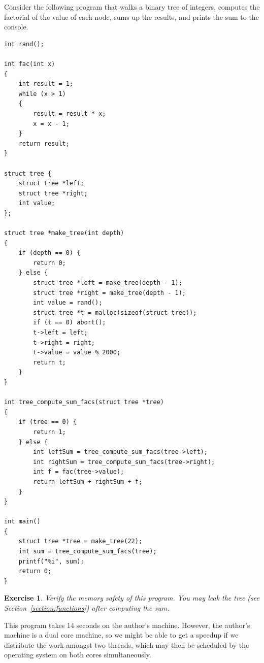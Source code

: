\documentclass{article}
\newtheorem{exercise}{Exercise}
\begin{document}
Consider the following program that walks a binary tree of
integers, computes the factorial of the value of each node, sums
up the results, and prints the sum to the console.
\begin{lstlisting}
int rand();

int fac(int x)
{
    int result = 1;
    while (x > 1)
    {
        result = result * x;
        x = x - 1;
    }
    return result;
}

struct tree {
    struct tree *left;
    struct tree *right;
    int value;
};

struct tree *make_tree(int depth)
{
    if (depth == 0) {
        return 0;
    } else {
        struct tree *left = make_tree(depth - 1);
        struct tree *right = make_tree(depth - 1);
        int value = rand();
        struct tree *t = malloc(sizeof(struct tree));
        if (t == 0) abort();
        t->left = left;
        t->right = right;
        t->value = value % 2000;
        return t;
    }
}

int tree_compute_sum_facs(struct tree *tree)
{
    if (tree == 0) {
        return 1;
    } else {
        int leftSum = tree_compute_sum_facs(tree->left);
        int rightSum = tree_compute_sum_facs(tree->right);
        int f = fac(tree->value);
        return leftSum + rightSum + f;
    }
}

int main()
{
    struct tree *tree = make_tree(22);
    int sum = tree_compute_sum_facs(tree);
    printf("%i", sum);
    return 0;
}
\end{lstlisting}

\begin{exercise}\label{exercise:threads0}
Verify the memory safety of this program. You may leak the tree (see Section~\ref{section:functions}) after computing the sum.
\end{exercise}

This program takes 14 seconds on the author's machine. However,
the author's machine is a dual core machine, so we might be
able to get a speedup if we distribute the work amongst two
threads, which may then be scheduled by the operating system on
both cores simultaneously.
\end{document}
